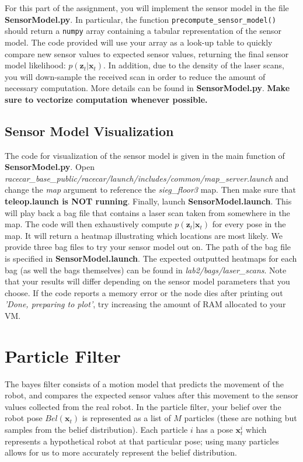 \documentclass[final]{article}
\begin{document}
For this part of the assignment, you will implement the sensor model in the file \textbf{SensorModel.py}. In particular, the function \texttt{precompute\_sensor\_model()} should return a \texttt{numpy} array containing a tabular representation of the sensor model. The code provided will use your array as a look-up table to quickly compare new sensor values to expected sensor values, returning the final sensor model likelihood: $p(\mathbf{z}_t | \mathbf{x}_t)$. In addition, due to the density of the laser scans, you will down-sample the received scan in order to reduce the amount of necessary computation. More details can be found in \textbf{SensorModel.py}. \textbf{Make sure to vectorize computation whenever possible.}

\subsection{Sensor Model Visualization}
The code for visualization of the sensor model is given in the main function of \textbf{SensorModel.py}. Open \textit{racecar\_base\_public/racecar/launch/includes/common/map\_server.launch} and change the \textit{map} argument to reference the \textit{sieg\_floor3} map. Then make sure that  \textbf{teleop.launch is NOT running}. Finally, launch \textbf{SensorModel.launch}. This will play back a bag file that contains a laser scan taken from somewhere in the map. The code will then exhaustively  compute $p(\mathbf{z}_t | \mathbf{x}_t)$ for every pose in the map. It will return a heatmap illustrating which locations are most likely. We provide three bag files to try your sensor model out on. The path of the bag file is specified in \textbf{SensorModel.launch}. The expected outputted heatmaps for each bag (as well the bags themselves) can be found in \textit{lab2/bags/laser\_scans}. Note that your results will differ depending on the sensor model parameters that you choose. If the code reports a memory error or the node dies after printing out 
\textit{'Done, preparing to plot'}, try increasing the amount of RAM allocated to your VM.
\section{Particle Filter}

The bayes filter consists of a motion model that predicts the movement of the robot, and compares the expected sensor values after this movement to the sensor values collected from the real robot. In the particle filter, your belief over the robot pose $Bel(\mathbf{x}_t)$ is represented as a list of $M$ particles (these are nothing but samples from the belief distribution). Each particle $i$ has a pose $\mathbf{x}^i_t$ which represents a hypothetical robot at that particular pose; using many particles allows for us to more accurately represent the belief distribution. 
\end{document}
